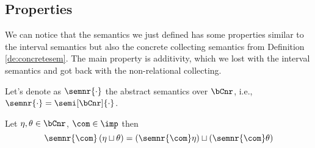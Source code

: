 \subsection{Properties}\label{sub:nonrelprop}

We can notice that the semantics we just defined has some properties
similar to the interval semantics but also the concrete collecting
semantics from Definition \ref{de:concretesem}. The main property is
additivity, which we lost with the interval semantics and got back
with the non-relational collecting.

\medskip

\noindent
Let's denote as \(\semnr{\cdot}\) the abstract semantics over
\(\bCnr\), i.e., \(\semnr{\cdot} = \semi[\bCnr]{\cdot}\).

\begin{lemma}[Additivity]
  Let \(\eta, \theta \in \bCnr\), \(\com\in\imp\) then
  \begin{equation*}
    \semnr{\com}\left(\eta \sqcup \theta\right) = \left(\semnr{\com}\eta\right) \sqcup \left(\semnr{\com}\theta\right)
  \end{equation*}
\end{lemma}

